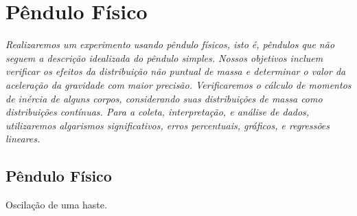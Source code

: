 \chapter{Pêndulo Físico} %
\label{Chap:PenduloFisico} %

\begin{fullwidth}\it
	Realizaremos um experimento usando pêndulo físicos, isto é, pêndulos que não seguem a descrição idealizada do pêndulo simples. Nossos objetivos incluem verificar os efeitos da distribuição não puntual de massa e determinar o valor da aceleração da gravidade com maior precisão. Verificaremos o cálculo de momentos de inércia de alguns corpos, considerando suas distribuições de massa como distribuições contínuas. Para a coleta, interpretação, e análise de dados, utilizaremos algarismos significativos, erros percentuais, gráficos, e regressões lineares. 
\end{fullwidth}

\section{Pêndulo Físico}

\begin{marginfigure}[2cm]
\centering
{}
\caption{Oscilação de uma haste. \label{Fig:TeoremaTrabalhoEnergiaRotacaoHaste}}
\end{marginfigure}


